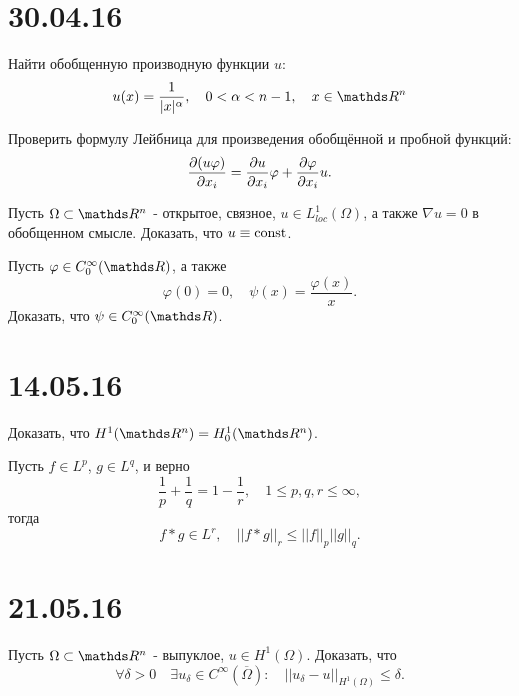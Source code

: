 \section*{30.04.16}
\begin{exercise}
Найти обобщенную производную функции $u$:
$$u(x) = \frac {1} {\abs{x}^{\alpha}}, \quad 0 < \alpha < n -1, \quad x \in \real^n$$
\end{exercise}

\begin{exercise}
Проверить формулу Лейбница для произведения обобщённой и пробной функций:
$$\pder[(u \varphi)]{x_i} = \pder[u]{x_i} \varphi + \pder[\varphi]{x_i} u.$$
\end{exercise}

\begin{exercise}
Пусть $\Omega \subset \real^n$ - открытое, связное, $u \in L_{loc}^1(\Omega)$, а также $\nabla u = 0$ в обобщенном смысле. Доказать, что $u \equiv \const$.
\end{exercise}

\begin{exercise} Пусть $\varphi \in C_0^{\infty} (\real)$, а также
$$ \varphi (0) = 0, \quad \psi (x) = \frac {\varphi (x)} {x} .$$
Доказать, что $\psi \in C_0^{\infty} (\real)$.
\end{exercise}

\section*{14.05.16}

\begin{exercise} Доказать, что $H^1 (\real^n) = H_0^1 (\real^n)$.
\end{exercise}

\begin{exercise}
Пусть $f \in L^p$, $g \in L^q$, и верно
$$\frac {1} {p} + \frac {1} {q} = 1 - \frac {1} {r}, \quad 1 \leq p,q,r \leq \infty, $$
тогда
$$f * g \in L^r, \quad || f*g ||_r \leq || f ||_p || g ||_q. $$
\end{exercise}

\section*{21.05.16}
\begin{exercise}
Пусть $\Omega \subset \real^n$ - выпуклое, $u \in H^1(\Omega)$. Доказать, что
$$\forall \delta > 0 \quad \exists u_{\delta} \in C^{\infty} (\overline{\Omega}):\quad ||u_{\delta} - u ||_{H^1(\Omega)} \leq \delta. $$
\end{exercise}

